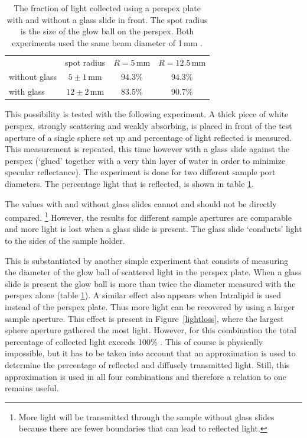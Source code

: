 \documentclass{article}
\begin{document}
\begin{table}[hbtp]
\centering
\begin{tabular}{lccc}
              &spot radius  &$R=5\,$mm  &$R=12.5\,$mm \\
without glass &$5 \pm1\,$mm &94.3\%			  &94.3\%		 \\
with glass				&$12\pm2\,$mm &83.5\%			  &90.7\%		 \\
\end{tabular}
\caption{The fraction of light collected using a perspex plate with
and without a glass slide in front.  The spot radius is the size of
the glow ball on the perspex.  Both experiments used the same beam
diameter of 1$\,$mm .}
\label{perspex}
\end{table}

This possibility is tested with the following experiment.  A thick piece of
white perspex, strongly scattering and weakly absorbing, is placed in front of
the test aperture of a single sphere set up and percentage of light reflected
is measured.  This measurement is repeated, this time however with a glass
slide against the perspex (`glued' together with a very thin layer of water in
order to minimize  specular reflectance).  The experiment is done for two
different sample port diameters.  The percentage
light that is reflected, is shown in table \ref{perspex}.

The values with and without glass slides cannot and should not be directly compared.%
\footnote{More light will be transmitted through the sample without glass
slides because there are fewer boundaries that can lead to reflected light.}
However, the results for different sample apertures are comparable and
more light is lost when a glass slide is present.  The  glass slide `conducts'
light to the sides of the sample holder.  

This is substantiated by another simple experiment that consists of measuring
the diameter of the glow ball of scattered light in the perspex plate.  When a
glass slide is present the glow ball is more than twice the diameter measured
with the perspex alone (table \ref{perspex}).  A similar effect
also appears when Intralipid is used instead of the perspex plate.  Thus more
light can be recovered by using a larger sample aperture.  This effect is
present in Figure~\ref{lightloss}, where the largest sphere aperture gathered
the most light. However, for this combination the total percentage of collected
light exceeds 100\% .  This of course is physically
impossible, but it has to be taken into account that an approximation is used
to determine the percentage of reflected and diffusely transmitted light. 
Still, this approximation is used in all four combinations and therefore a
relation to one remains useful.
\end{document}
